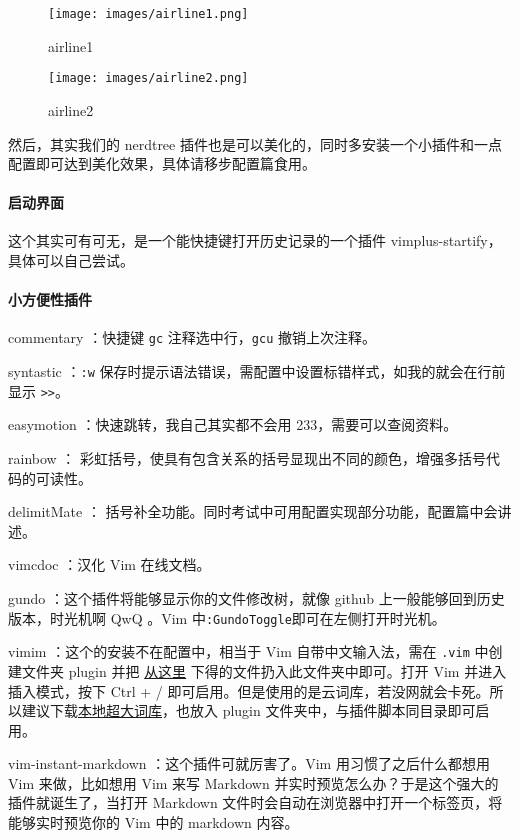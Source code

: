 \begin{figure}[h]
\centering
\texttt{[image: images/airline1.png]} 
\caption{airline1}
\end{figure}

\begin{figure}[h]
\centering
\texttt{[image: images/airline2.png]} 
\caption{airline2}
\end{figure}

然后，其实我们的 nerdtree 插件也是可以美化的，同时多安装一个小插件和一点配置即可达到美化效果，具体请移步配置篇食用。

\paragraph{启动界面}

这个其实可有可无，是一个能快捷键打开历史记录的一个插件 vimplus-startify，具体可以自己尝试。

\paragraph{小方便性插件}

commentary ：快捷键 \texttt{gc} 注释选中行，\texttt{gcu} 撤销上次注释。

syntastic ：\texttt{:w} 保存时提示语法错误，需配置中设置标错样式，如我的就会在行前显示 \texttt{>>}。

easymotion ：快速跳转，我自己其实都不会用 233，需要可以查阅资料。

rainbow ： 彩虹括号，使具有包含关系的括号显现出不同的颜色，增强多括号代码的可读性。

delimitMate ： 括号补全功能。同时考试中可用配置实现部分功能，配置篇中会讲述。

vimcdoc ：汉化 Vim 在线文档。

gundo ：这个插件将能够显示你的文件修改树，就像 github 上一般能够回到历史版本，时光机啊 QwQ 。Vim 中\texttt{:GundoToggle}即可在左侧打开时光机。

vimim ：这个的安装不在配置中，相当于 Vim 自带中文输入法，需在 \texttt{.vim} 中创建文件夹 plugin 并把 \href{https://www.vim.org/scripts/download_script.php?src_id=23122}{从这里} 下得的文件扔入此文件夹中即可。打开 Vim 并进入插入模式，按下 Ctrl + / 即可启用。但是使用的是云词库，若没网就会卡死。所以建议下载\href{https://github.com/vimim/vimim/raw/master/plugin/vimim.gbk.bsddb}{本地超大词库}，也放入 plugin 文件夹中，与插件脚本同目录即可启用。

vim-instant-markdown ：这个插件可就厉害了。Vim 用习惯了之后什么都想用 Vim 来做，比如想用 Vim 来写 Markdown 并实时预览怎么办？于是这个强大的插件就诞生了，当打开 Markdown 文件时会自动在浏览器中打开一个标签页，将能够实时预览你的 Vim 中的 markdown 内容。

